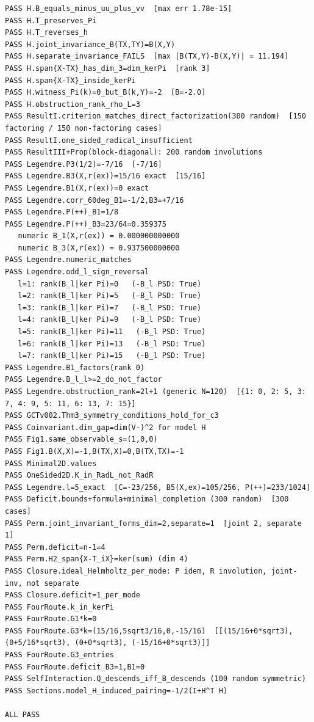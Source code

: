 \documentclass[11pt,a4paper]{article}
\theoremstyle{plain}
\theoremstyle{definition}
\begin{document}
\begin{lstlisting}[numbers=none,xleftmargin=0pt,basicstyle=\ttfamily\tiny,breaklines=true]
PASS H.B_equals_minus_uu_plus_vv  [max err 1.78e-15]
PASS H.T_preserves_Pi
PASS H.T_reverses_h
PASS H.joint_invariance_B(TX,TY)=B(X,Y)
PASS H.separate_invariance_FAILS  [max |B(TX,Y)-B(X,Y)| = 11.194]
PASS H.span{X-TX}_has_dim_3=dim_kerPi  [rank 3]
PASS H.span{X-TX}_inside_kerPi
PASS H.witness_Pi(k)=0_but_B(k,Y)=-2  [B=-2.0]
PASS H.obstruction_rank_rho_L=3
PASS ResultI.criterion_matches_direct_factorization(300 random)  [150 factoring / 150 non-factoring cases]
PASS ResultI.one_sided_radical_insufficient
PASS ResultIII+Prop(block-diagonal): 200 random involutions
PASS Legendre.P3(1/2)=-7/16  [-7/16]
PASS Legendre.B3(X,r(ex))=15/16 exact  [15/16]
PASS Legendre.B1(X,r(ex))=0 exact
PASS Legendre.corr_60deg_B1=-1/2,B3=+7/16
PASS Legendre.P(++)_B1=1/8
PASS Legendre.P(++)_B3=23/64=0.359375
   numeric B_1(X,r(ex)) = 0.000000000000
   numeric B_3(X,r(ex)) = 0.937500000000
PASS Legendre.numeric_matches
PASS Legendre.odd_l_sign_reversal
   l=1: rank(B_l|ker Pi)=0   (-B_l PSD: True)
   l=2: rank(B_l|ker Pi)=5   (-B_l PSD: True)
   l=3: rank(B_l|ker Pi)=7   (-B_l PSD: True)
   l=4: rank(B_l|ker Pi)=9   (-B_l PSD: True)
   l=5: rank(B_l|ker Pi)=11   (-B_l PSD: True)
   l=6: rank(B_l|ker Pi)=13   (-B_l PSD: True)
   l=7: rank(B_l|ker Pi)=15   (-B_l PSD: True)
PASS Legendre.B1_factors(rank 0)
PASS Legendre.B_l_l>=2_do_not_factor
PASS Legendre.obstruction_rank=2l+1 (generic N=120)  [{1: 0, 2: 5, 3: 7, 4: 9, 5: 11, 6: 13, 7: 15}]
PASS GCTv002.Thm3_symmetry_conditions_hold_for_c3
PASS Coinvariant.dim_gap=dim(V-)^2 for model H
PASS Fig1.same_observable_s=(1,0,0)
PASS Fig1.B(X,X)=-1,B(TX,X)=0,B(TX,TX)=-1
PASS Minimal2D.values
PASS OneSided2D.K_in_RadL_not_RadR
PASS Legendre.l=5_exact  [C=-23/256, B5(X,ex)=105/256, P(++)=233/1024]
PASS Deficit.bounds+formula+minimal_completion (300 random)  [300 cases]
PASS Perm.joint_invariant_forms_dim=2,separate=1  [joint 2, separate 1]
PASS Perm.deficit=n-1=4
PASS Perm.H2_span{X-T_iX}=ker(sum) (dim 4)
PASS Closure.ideal_Helmholtz_per_mode: P idem, R involution, joint-inv, not separate
PASS Closure.deficit=1_per_mode
PASS FourRoute.k_in_kerPi
PASS FourRoute.G1*k=0
PASS FourRoute.G3*k=(15/16,5sqrt3/16,0,-15/16)  [[(15/16+0*sqrt3), (0+5/16*sqrt3), (0+0*sqrt3), (-15/16+0*sqrt3)]]
PASS FourRoute.G3_entries
PASS FourRoute.deficit_B3=1,B1=0
PASS SelfInteraction.Q_descends_iff_B_descends (100 random symmetric)
PASS Sections.model_H_induced_pairing=-1/2(I+H^T H)

ALL PASS
\end{lstlisting}
\end{document}
